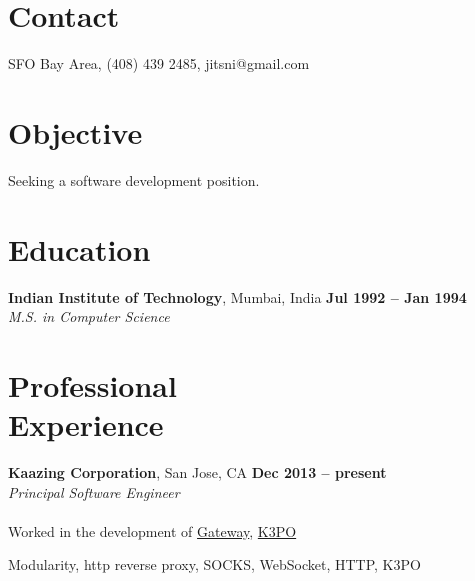 \documentclass[margin,line]{resume}
\begin{document}
\begin{resume}

\section{\mysidestyle Contact}

SFO Bay Area, (408) 439 2485, jitsni@gmail.com


\section{\mysidestyle Objective}

Seeking a software development position.

\section{\mysidestyle Education}

\textbf{Indian Institute of Technology}, Mumbai, India \hfill \textbf{Jul 1992 -- Jan 1994}\\
\textsl{M.S. in Computer Science}


\section{\mysidestyle Professional\\Experience}

    \textbf{Kaazing Corporation}, San Jose, CA \hfill \textbf{Dec 2013 -- present}\\ 
    \textsl{Principal Software Engineer}\\\\
Worked in the development of \href{http://github.com/kaazing/gateway}{Gateway}, \href{http://github.com/kaazing/k3po}{K3PO}
    \begin{list2}
    \item Modularity, http reverse proxy, SOCKS, WebSocket, HTTP, K3PO
    \end{list2}\vspace{-1.5mm}


\end{resume}
\end{document}
